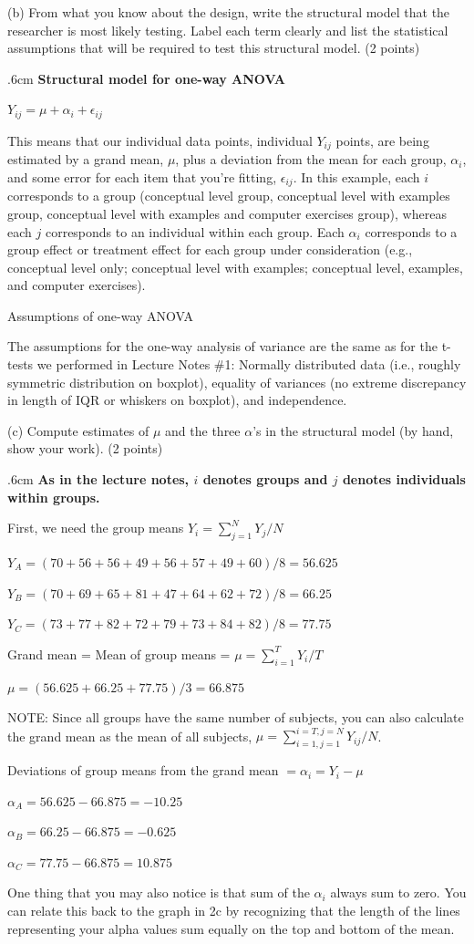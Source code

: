 \documentclass[11pt, oneside]{article}   	%
\newenvironment{answer}{\begin{adjustwidth}{.6cm}{}\bfseries}{\end{adjustwidth}}
\begin{document}
(b) From what you know about the design, write the structural model that the researcher is most likely testing. Label each term clearly and list the statistical assumptions that will be required to test this structural model. (2 points)
\begin{answer}
Structural model for one-way ANOVA

$Y_{ij} = \mu + \alpha_i + \epsilon_{ij}$

This means that our individual data points, individual $Y_{ij}$ points, are being estimated by a grand mean, $\mu$, plus a deviation from the mean for each group, $\alpha_i$, and some error for each item that you're fitting, $\epsilon_{ij}$. In this example, each $i$ corresponds to a group (conceptual level group, conceptual level with examples group, conceptual level with examples and computer exercises group), whereas each $j$ corresponds to an individual within each group. Each $\alpha_i$ corresponds to a group effect or treatment effect for each group under consideration (e.g., conceptual level only; conceptual level with examples; conceptual level, examples, and computer exercises).

Assumptions of one-way ANOVA

The assumptions for the one-way analysis of variance are the same as for the t-tests we performed in Lecture Notes $\#$1: Normally distributed data (i.e., roughly symmetric distribution on boxplot), equality of variances (no extreme discrepancy in length of IQR or whiskers on boxplot), and independence.
\end{answer}
(c) Compute estimates of $\mu$ and the three $\alpha$'s in the structural model (by hand, show your work). (2 points)
\begin{answer}
As in the lecture notes, $i$ denotes groups and $j$ denotes individuals within groups.

First, we need the group means $Y_i = \sum_{j=1}^{N}Y_j/N$ 

$Y_A=(70+56+56+49+56+57+49+60)/8 = 56.625$ 

$Y_B=(70+69+65+81+47+64+62+72)/8 = 66.25$

$Y_C=(73+77+82+72+79+73+84+82)/8 = 77.75 $

Grand mean = Mean of group means = $\mu=\sum_{i=1}^{T}Y_i/T$

$\mu = (56.625 + 66.25 + 77.75)/3 = 66.875$

NOTE: Since all groups have the same number of subjects, you can also calculate the grand mean as the mean of all subjects, $\mu=\sum_{i=1, j=1}^{i=T,j=N}Y_{ij}/N$. 

Deviations of group means from the grand mean $= \alpha_i=Y_i-\mu$ 

$\alpha_A=56.625-66.875=-10.25 $

$\alpha_B=66.25-66.875=-0.625 $

$\alpha_C=77.75-66.875=10.875 $

One thing that you may also notice is that sum of the $\alpha_i$ always sum to zero. You can relate this back to the graph in 2c by recognizing that the length of the lines representing your alpha values sum equally on the top and bottom of the mean. 
\end{answer}
\end{document}
